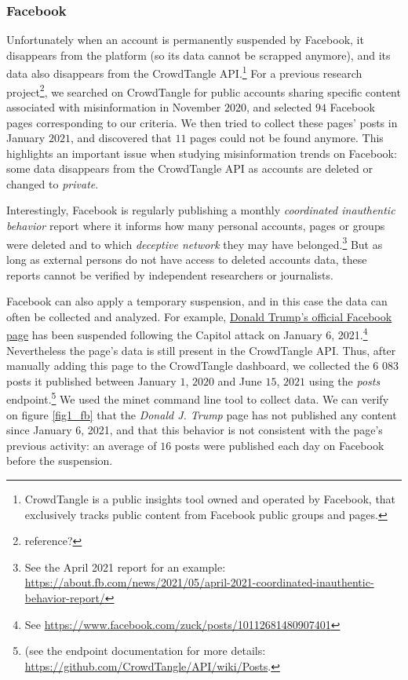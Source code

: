 \documentclass[11pt,a4paper]{article}
\begin{document}
\subsubsection{Facebook}

Unfortunately when an account is permanently suspended by Facebook, it disappears from the platform (so its data cannot be scrapped anymore), and its data also disappears from the CrowdTangle API.\footnote{CrowdTangle is a public insights tool owned and operated by Facebook, that exclusively tracks public content from Facebook public groups and pages.} For a previous research project\footnote{reference?}, we searched on CrowdTangle for public accounts sharing specific content associated with misinformation in November $2020$, and selected $94$ Facebook pages corresponding to our criteria. We then tried to collect these pages' posts in January $2021$, and discovered that $11$ pages could not be found anymore. This highlights an important issue when studying misinformation trends on Facebook: some data disappears from the CrowdTangle API as accounts are deleted or changed to {\it private}.

Interestingly, Facebook is regularly publishing a monthly {\it coordinated inauthentic behavior} report where it informs how many personal accounts, pages or groups were deleted and to which {\it deceptive network} they may have belonged.\footnote{See the April 2021 report for an example: \href{https://about.fb.com/news/2021/05/april-2021-coordinated-inauthentic-behavior-report/}{https://about.fb.com/news/2021/05/april-2021-coordinated-inauthentic-behavior-report/}} But as long as external persons do not have access to deleted accounts data, these reports cannot be verified by independent researchers or journalists.

Facebook can also apply a temporary suspension, and in this case the data can often be collected and analyzed. For example, \href{https://www.facebook.com/DonaldTrump/}{Donald Trump’s official Facebook page}  has been suspended following the Capitol attack on January 6, 2021.\footnote{See \href{https://www.facebook.com/zuck/posts/10112681480907401}{https://www.facebook.com/zuck/posts/10112681480907401}} Nevertheless the page’s data is still present in the CrowdTangle API. Thus, after manually adding this page to the CrowdTangle dashboard, we collected the $6$ $083$ posts it published between January $1$, $2020$ and June $15$, $2021$ using the {\it posts} endpoint.\footnote{ (see the endpoint documentation for more details: \href{https://github.com/CrowdTangle/API/wiki/Posts}{https://github.com/CrowdTangle/API/wiki/Posts}.} We used the minet command line tool \cite{minet} to collect data. We can verify on figure \ref{fig1_fb} that the {\it Donald J. Trump} page has not published any content since January $6$, 2021, and that this behavior is not consistent with the page’s previous activity: an average of $16$ posts were published each day on Facebook before the suspension. 
\end{document}
